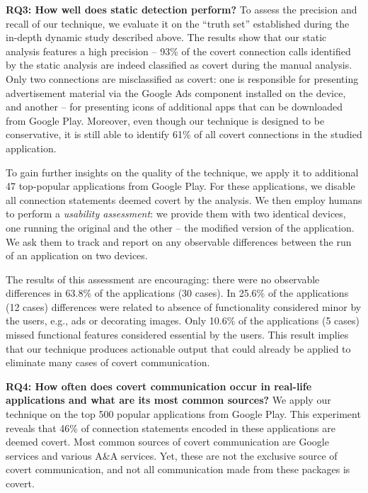 \noindent 
{\bf RQ3: How well does static detection perform?}
To assess the precision and recall of our technique, we evaluate it on the ``truth set'' established during the in-depth dynamic study described above. %
The results show that our static analysis features a high precision -- 93\% of the covert connection calls identified by the static analysis are indeed classified as covert during the manual analysis. Only two connections are misclassified as covert: one is responsible for presenting advertisement material via the Google Ads component installed on the device, and another -- for presenting icons of additional apps that can be downloaded from Google Play. 
Moreover, even though our technique is designed to be conservative, it is still able to identify 61\% of all covert connections in the studied application.


To gain further insights on the quality of the technique, we apply it to additional 47 top-popular applications from Google Play. For these applications, we disable all connection statements deemed covert by the analysis. We then employ humans to perform a \emph{usability assessment}: we provide them with two identical devices, one running the original and the other -- the modified version of the application. We ask them to track and report on any observable differences between the run of an application on two devices. 

The results of this  assessment are encouraging: there were no observable differences in 63.8\% of the applications (30 cases). In 25.6\% of the applications (12 cases) differences were related to absence of functionality considered minor by the users, e.g., ads or decorating images. Only 10.6\% of the applications (5 cases) missed functional features considered essential by the users. 
This result implies that our technique produces actionable output that could already be applied to eliminate many cases of covert communication. 


\noindent 
{\bf RQ4: How often does covert communication occur in real-life applications and what are its most common sources?}
We apply our technique on the top 500 popular applications from Google Play. This experiment reveals that 46\% of connection statements encoded in these applications 
are deemed covert.
Most common sources of covert communication are Google services %
and various A\&A services. Yet, these are not the exclusive source of covert communication, and not all communication made from these packages is covert. 

